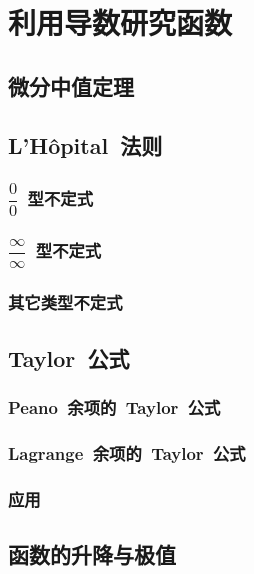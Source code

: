 

\chapter{利用导数研究函数}\label{ch:5}
\section{微分中值定理}
\begin{exercise}
\item
\end{exercise}
\section{L'H\^opital~法则}
\subsection{$\dfrac 00$~型不定式}
\subsection{$\dfrac\infty\infty$~型不定式}
\subsection{其它类型不定式}
\begin{exercise}
\item
\end{exercise}
\section{Taylor~公式}
\subsection{Peano~余项的~Taylor~公式}
\subsection{Lagrange~余项的~Taylor~公式}
\subsection{应用}
\begin{exercise}
\item
\end{exercise}
\section{函数的升降与极值}
